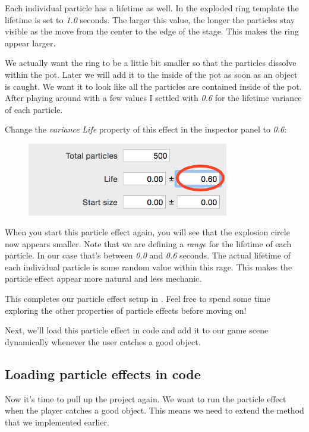 Each individual particle has a lifetime as well. In the exploded ring template
the lifetime is set to \textit{1.0} seconds. The larger this value, the longer
the particles stay visible as the move from the center to the edge of the stage.
This makes the ring appear larger. 

We actually want the ring to be a little bit smaller so that the particles
dissolve within the pot. Later we will add it to the inside of the pot as soon
as an object is caught. We want it to look like all the particles are contained inside of the pot. After playing around with a
few values I settled with \textit{0.6} for the lifetime variance of each
particle.

\begin{leftbar}
Change the \textit{variance} \textit{Life} property of this effect in the
inspector panel to \textit{0.6}:
\begin{figure}[H]
  \centering
  \includegraphics[width=250pt]{images/Chapter9/change_lifetime.png}
\end{figure}
\end{leftbar}

When you start this particle effect again, you will see that the explosion
circle now appears smaller. Note that we are defining a \textit{range} for the lifetime
of each particle. In our case that's between \textit{0.0} and \textit{0.6}
seconds. The actual lifetime of each individual particle is some random value
within this rage. This makes the particle effect appear more natural and less
mechanic.

This completes our particle effect setup in \SB{}. Feel
free to spend some time exploring the other properties of particle effects
before moving on!

Next, we'll load this particle effect in code and add it to our game scene
dynamically whenever the user catches a good object.

\subsection{Loading particle effects in code}
Now it's time to pull up the \xcode{} project again. We want to run the particle
effect when the player catches a good object. This means we need to extend the
 method that we implemented earlier.

